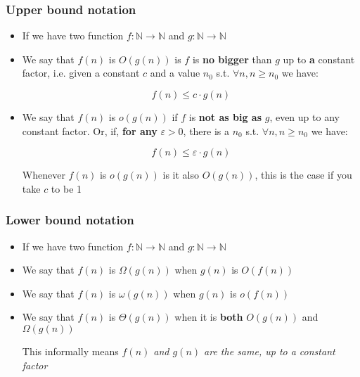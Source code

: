\message{ !name(AlgComplexAllFlashCards.tex)}\documentclass{beamer}
\newcommand{\N}{\mathbb{N}}
\begin{document}
  \begin{frame}
    \frametitle{Upper bound notation}

    \begin{itemize}
      \item     If we have two function $f : \N \rightarrow \N$ and $g : \N \rightarrow \N$
      \item We say that $f(n)$ is $O(g(n))$ is $f$ is \textbf{no bigger} than $g$ up to \textbf{a}  constant factor, i.e. given a constant $c$ and a value $n_{0}$ s.t. $\forall n, n \geq n_{0}$ we have:

            \[
            f(n) \leq c\cdot g(n)
            \]

      \item We say that $f(n)$ is $o(g(n))$ if $f$ is \textbf{not as big as }$g$, even up to any constant factor. Or, if, \textbf{for any} $\varepsilon > 0$, there is a $n_{0}$ s.t. $\forall n, n\geq n_{0}$ we have:

            \[
            f(n) \leq \varepsilon \cdot g(n)
            \]

            Whenever $f(n)$ is $o(g(n))$ is it also $O(g(n))$, this is the case if you take $c$ to be 1

    \end{itemize}


  \end{frame}

  \begin{frame}
    \frametitle{Lower bound notation}

    \begin{itemize}
      \item     If we have two function $f : \N \rightarrow \N$ and $g : \N \rightarrow \N$
      \item We say that $f(n)$ is $\Omega(g(n))$ when $g(n)$ is $O(f(n))$
      \item We say that $f(n)$ is $\omega(g(n))$ when $g(n)$ is $o(f(n))$
      \item We say that $f(n)$ is $\Theta(g(n))$ when it is \textbf{both} $O(g(n))$ and $\Omega(g(n))$

            This informally means \textit{$f(n)$ and $g(n)$ are the same, up to a constant factor}
    \end{itemize}
  \end{frame}
\end{document}
